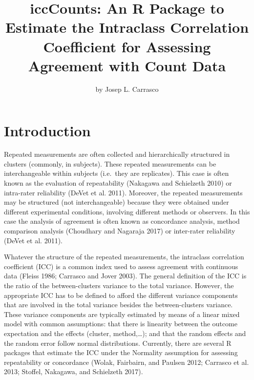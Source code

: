 \title{iccCounts: An R Package to Estimate the Intraclass Correlation Coefficient for Assessing Agreement with Count Data}
\author{by Josep L. Carrasco}

\maketitle


\hypertarget{introduction}{%
\section{Introduction}\label{introduction}}

Repeated measurements are often collected and hierarchically structured in clusters (commonly, in subjects). These repeated measurements can be interchangeable within subjects (i.e.~they are replicates). This case is often known as the evaluation of repeatability (Nakagawa and Schielzeth 2010) or intra-rater reliability (DeVet et al. 2011). Moreover, the repeated measurements may be structured (not interchangeable) because they were obtained under different experimental conditions, involving different methods or observers. In this case the analysis of agreement is often known as concordance analysis, method comparison analysis (Choudhary and Nagaraja 2017) or inter-rater reliability (DeVet et al. 2011).

Whatever the structure of the repeated measurements, the intraclass correlation coefficient (ICC) is a common index used to assess agreement with continuous data (Fleiss 1986; Carrasco and Jover 2003). The general definition of the ICC is the ratio of the between-clusters variance to the total variance. However, the appropriate ICC has to be defined to afford the different variance components that are involved in the total variance besides the between-clusters variance. These variance components are typically estimated by means of a linear mixed model with common assumptions: that there is linearity between the outcome expectation and the effects (cluster, method,\ldots); and that the random effects and the random error follow normal distributions. Currently, there are several R packages that estimate the ICC under the Normality assumption for assessing repeatability or concordance (Wolak, Fairbairn, and Paulsen 2012; Carrasco et al. 2013; Stoffel, Nakagawa, and Schielzeth 2017).


